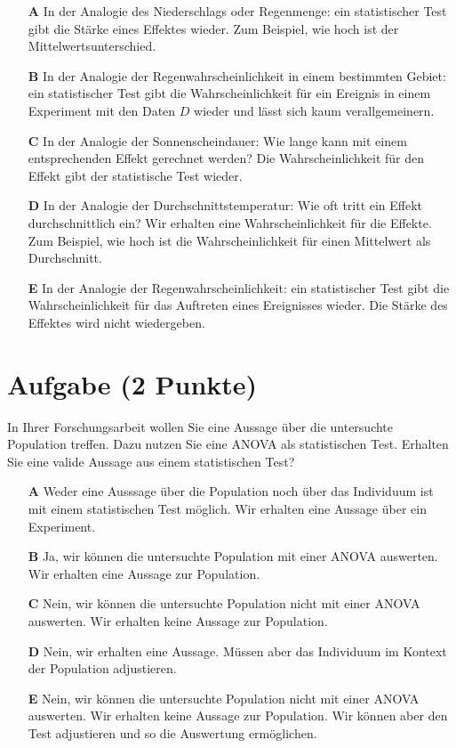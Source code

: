 \documentclass[a4paper, 9pt]{scrartcl}\usepackage[]{graphicx}\usepackage[]{xcolor}
\begin{document}
\begin{enumerate}
\item [\textbf{A} \msquare] In der Analogie des Niederschlags oder Regenmenge: ein statistischer Test gibt die Stärke eines Effektes wieder. Zum Beispiel, wie hoch ist der Mittelwertsunterschied.
\item [\textbf{B} \msquare] In der Analogie der Regenwahrscheinlichkeit in einem bestimmten Gebiet: ein statistischer Test gibt die Wahrscheinlichkeit für ein Ereignis in einem Experiment mit den Daten $D$ wieder und lässt sich kaum verallgemeinern.
\item [\textbf{C} \msquare] In der Analogie der Sonnenscheindauer: Wie lange kann mit einem entsprechenden Effekt gerechnet werden? Die Wahrscheinlichkeit für den Effekt gibt der statistische Test wieder.
\item [\textbf{D} \msquare] In der Analogie der Durchschnittstemperatur: Wie oft tritt ein Effekt durchschnittlich ein? Wir erhalten eine Wahrscheinlichkeit für die Effekte. Zum Beispiel, wie hoch ist die Wahrscheinlichkeit für einen Mittelwert als Durchschnitt.
\item [\textbf{E} \msquare] In der Analogie der Regenwahrscheinlichkeit: ein statistischer Test gibt die Wahrscheinlichkeit für das Auftreten eines Ereignisses wieder. Die Stärke des Effektes wird nicht wiedergeben.
\end{enumerate}

\section{Aufgabe \hfill (2 Punkte)}



In Ihrer Forschungsarbeit wollen Sie eine Aussage über die untersuchte Population treffen. Dazu nutzen Sie eine ANOVA als statistischen Test. Erhalten Sie eine valide Aussage aus einem statistischen Test?



\begin{enumerate}
\item [\textbf{A} \msquare] Weder eine Ausssage über die Population noch über das Individuum ist mit einem statistischen Test möglich. Wir erhalten eine Aussage über ein Experiment.
\item [\textbf{B} \msquare] Ja, wir können die untersuchte Population mit einer ANOVA auswerten. Wir erhalten eine Aussage zur Population.
\item [\textbf{C} \msquare] Nein, wir können die untersuchte Population nicht mit einer ANOVA auswerten. Wir erhalten keine Aussage zur Population.
\item [\textbf{D} \msquare] Nein, wir erhalten eine Aussage. Müssen aber das Individuum im Kontext der Population adjustieren.
\item [\textbf{E} \msquare] Nein, wir können die untersuchte Population nicht mit einer ANOVA auswerten. Wir erhalten keine Aussage zur Population. Wir können aber den Test adjustieren und so die Auswertung ermöglichen.
\end{enumerate}
\end{document}

